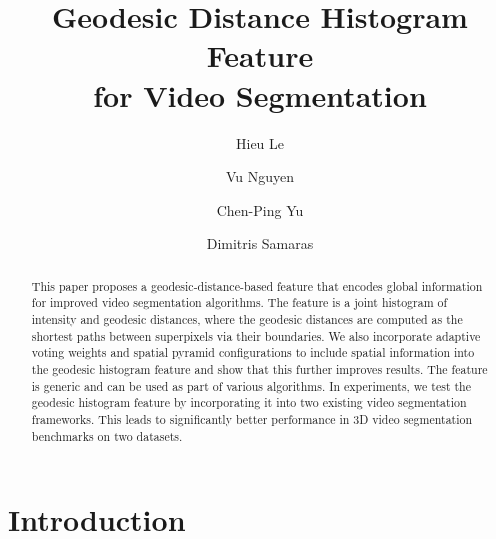 \documentclass[runningheads]{llncs}
\begin{document}
\newcommand{\point}{
    \raise0.7ex\hbox{.}
    }



\pagestyle{headings}

\mainmatter

\title{Geodesic Distance Histogram Feature \\for Video Segmentation} 



\author{Hieu Le \and Vu Nguyen \and Chen-Ping Yu \and Dimitris Samaras}  

\maketitle

\begin{abstract}
This paper proposes a geodesic-distance-based feature that encodes global information for improved video segmentation algorithms. The feature is a joint histogram of intensity and geodesic distances, where the geodesic distances are computed as the shortest paths between superpixels via their boundaries. We also incorporate adaptive voting weights and spatial pyramid configurations to include spatial information into the geodesic histogram feature and show that this further improves results. The feature is generic and can be used as part of various algorithms. In experiments, we test the geodesic histogram feature by incorporating it into two existing video segmentation frameworks. This leads to significantly better performance in 3D video segmentation benchmarks on two datasets. 
\end{abstract}

\section{Introduction}
\label{sec:intro}
\end{document}
